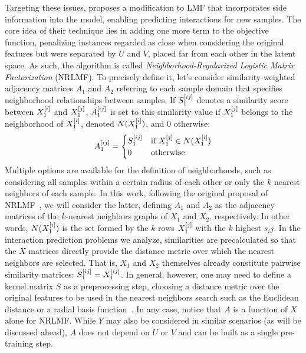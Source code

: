 Targeting these issues,  proposes a modification to LMF that incorporates side information into the model, enabling predicting interactions for new samples.
%
The core idea of their technique lies in adding one more term to the objective function, penalizing instances regarded as close when considering the original features but were separated by $U$ and $V$, placed far from each other in the latent space. As such, the algorithm is called \emph{Neighborhood-Regularized Logistic Matrix Factorization} (NRLMF).
%
To precisely define it, let's consider similarity-weighted adjacency matrices $A_1$ and $A_2$ referring to each sample domain that specifies neighborhood relationships between samples. If $S_1^{[ij]}$ denotes a similarity score between $X_1^{[i]}$ and $X_1^{[j]}$, $A_1^{[ij]}$ is set to this similarity value if $X_1^{[j]}$ belongs to the neighborhood of $X_1^{[i]}$, denoted $N(X_1^{[i]})$, and 0 otherwise:
%
\begin{equation}
    A_1^{[ij]} =
    \begin{cases}
        S_1^{[ij]} & \text{if } X_1^{[j]} \in N(X_1^{[i]})\\
        0 & \text{otherwise}
    \end{cases}
    \label{eq:nrlmf_A}
\end{equation}
%
Multiple options are available for the definition of neighborhoods, such as considering all samples within a certain radius of each other or only the $k$ nearest neighbors of each sample. In this work, following the original proposal of NRLMF~\cite{liu2016neighborhood}, we will consider the latter, defining $A_1$ and $A_2$ as the adjacency matrices of the $k$-nearest neighbors graphs of $X_1$ and $X_2$, respectively. In other words, $N(X_1^{[i]})$ is the set formed by the $k$ rows $X_1^{[j]}$ with the $k$ highest $s_ij$. In the interaction prediction problems we analyze, similarities are precalculated so that the $X$ matrices directly provide the distance metric over which the nearest neighbors are selected. That is, $X_1$ and $X_2$ themselves already constitute pairwise similarity matrices: $S_1^{[ij]} = X_1^{[ij]}$. In general, however, one may need to define a kernel matrix $S$ as a preprocessing step, choosing a distance metric over the original features to be used in the nearest neighbors search such as the Euclidean distance or a radial basis function~\cite{vanlaarhoven2011gaussian}. In any case, notice that $A$ is a function of $X$ alone for NRLMF. While $Y$ may also be considered in similar scenarios (as will be discussed ahead), $A$ does not depend on $U$ or $V$ and can be built as a single pre-training step.

